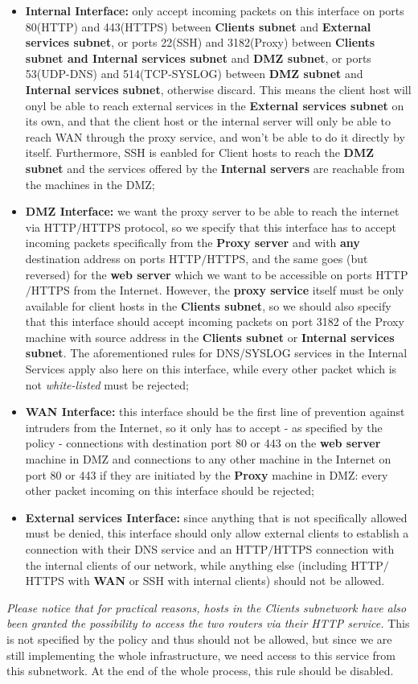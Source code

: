 \begin{itemize}
\item \textbf{Internal Interface:} only accept incoming packets on this interface on ports 80(HTTP) and 443(HTTPS) between \textbf{Clients subnet} and \textbf{External services subnet}, or ports 22(SSH) and 3182(Proxy) between \textbf{Clients subnet and Internal services subnet} and \textbf{DMZ subnet}, or ports 53(UDP-DNS) and 514(TCP-SYSLOG) between \textbf{DMZ subnet} and \textbf{Internal services subnet}, otherwise discard. This means the client host will onyl be able to reach external services in the \textbf{External services subnet} on its own, and that the client host or the internal server will only be able to reach WAN through the proxy service, and won't be able to do it directly by itself. Furthermore, SSH is eanbled for Client hosts to reach the \textbf{DMZ subnet} and the services offered by the \textbf{Internal servers} are reachable from the machines in the DMZ;
\item \textbf{DMZ Interface:} we want the proxy server to be able to reach the internet via HTTP$/$HTTPS protocol, so we specify that this interface has to accept incoming packets specifically from the \textbf{Proxy server} and with \textbf{any} destination address on ports HTTP$/$HTTPS, and the same goes (but reversed) for the \textbf{web server} which we want to be accessible on ports HTTP$/$HTTPS from the Internet. However, the \textbf{proxy service} itself must be only available for client hosts in the \textbf{Clients subnet}, so we should also specify that this interface should accept incoming packets on port 3182 of the Proxy machine with source address in the \textbf{Clients subnet} or \textbf{Internal services subnet}. The aforementioned rules for DNS/SYSLOG services in the Internal Services apply also here on this interface, while every other packet which is not \textit{white-listed} must be rejected;
\item \textbf{WAN Interface:} this interface should be the first line of prevention against intruders from the Internet, so it only has to accept - as specified by the policy - connections with destination port 80 or 443 on the \textbf{web server} machine in DMZ and connections to any other machine in the Internet on port 80 or 443 if they are initiated by the \textbf{Proxy} machine in DMZ: every other packet incoming on this interface should be rejected;
\item \textbf{External services Interface:} since anything that is not specifically allowed must be denied, this interface should only allow external clients to establish a connection with their DNS service and an HTTP$/$HTTPS connection with the internal clients of our network, while anything else (including HTTP$/$HTTPS with \textbf{WAN} or SSH with internal clients) should not be allowed.
\end{itemize}

\textit{Please notice that for practical reasons, hosts in the Clients subnetwork have also been granted the possibility to access the two routers via their HTTP service.} This is not specified by the policy and thus should not be allowed, but since we are still implementing the whole infrastructure, we need access to this service from this subnetwork. At the end of the whole process, this rule should be disabled.
